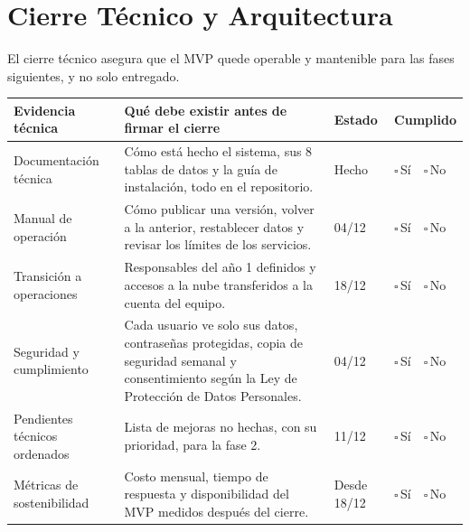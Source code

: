 \documentclass[11pt,a4paper]{article}
\newcommand{\marca}{{\Large$\square$}\,{\scriptsize Sí}\ \ {\Large$\square$}\,{\scriptsize No}}
\begin{document}
\section{Cierre Técnico y Arquitectura}
El cierre técnico asegura que el MVP quede operable y mantenible para las fases siguientes, y no solo entregado.

\vspace{0.1cm}
{\small
{}
\noindent\begin{tabularx}{\textwidth}{@{}P{3.2cm} L C{1.6cm} C{2.0cm}@{}}
\toprule
{}
\textbf{Evidencia técnica} & \textbf{Qué debe existir antes de firmar el cierre} & \textbf{Estado} & \textbf{Cumplido} \\
\midrule
Documentación técnica & Cómo está hecho el sistema, sus 8 tablas de datos y la guía de instalación, todo en el repositorio. & Hecho & \marca \\
Manual de operación & Cómo publicar una versión, volver a la anterior, restablecer datos y revisar los límites de los servicios. & 04/12 & \marca \\
Transición a operaciones & Responsables del año 1 definidos y accesos a la nube transferidos a la cuenta del equipo. & 18/12 & \marca \\
Seguridad y cumplimiento & Cada usuario ve solo sus datos, contraseñas protegidas, copia de seguridad semanal y consentimiento según la Ley de Protección de Datos Personales. & 04/12 & \marca \\
Pendientes técnicos ordenados & Lista de mejoras no hechas, con su prioridad, para la fase 2. & 11/12 & \marca \\
Métricas de sostenibilidad & Costo mensual, tiempo de respuesta y disponibilidad del MVP medidos después del cierre. & Desde 18/12 & \marca \\
\bottomrule
\end{tabularx}
}

\end{document}
